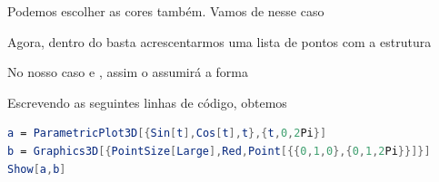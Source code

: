 \documentclass[a4paper, 12pt]{article}
\begin{document}
\begin{center}
\end{center}

Podemos escolher as cores também. Vamos de  nesse caso

\begin{center}
\end{center}

Agora, dentro do  basta acrescentarmos uma lista de pontos com a estrutura

\begin{center}
\end{center}

No nosso caso  e , assim o  assumirá a forma

\begin{center}
\end{center}

Escrevendo as seguintes linhas de código, obtemos

\begin{lstlisting}[language=Mathematica]
a = ParametricPlot3D[{Sin[t],Cos[t],t},{t,0,2Pi}]
b = Graphics3D[{PointSize[Large],Red,Point[{{0,1,0},{0,1,2Pi}}]}]
Show[a,b]
\end{lstlisting}
\end{document}
